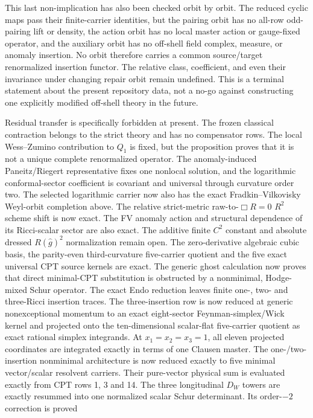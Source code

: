 \documentclass[11pt]{article}
\theoremstyle{definition}
\theoremstyle{remark}
\begin{document}
This last non-implication has also been checked orbit by orbit.  The reduced
cyclic maps pass their finite-carrier identities, but the pairing orbit has
no all-row odd-pairing lift or density, the action orbit has no local master
action or gauge-fixed operator, and the auxiliary orbit has no off-shell
field complex, measure, or anomaly insertion.  No orbit therefore carries a
common source/target renormalized insertion functor.  The relative class,
coefficient, and even their invariance under changing repair orbit remain
undefined.  This is a terminal statement about the present repository data,
not a no-go against constructing one explicitly modified off-shell theory in
the future.

Residual transfer is specifically forbidden at present.  The frozen classical
contraction belongs to the strict theory and has no compensator rows.  The
local Wess--Zumino contribution to $Q_1$ is fixed, but the proposition proves
that it is not a unique complete renormalized operator.  The
anomaly-induced Paneitz/Riegert representative fixes one nonlocal solution,
and the logarithmic conformal-sector coefficient is covariant and universal
through curvature order two.  The selected logarithmic carrier now also has
the exact Fradkin--Vilkovisky Weyl-orbit completion above.  The relative
strict-metric raw-to-$\Box R=0$
$R^2$ scheme shift is now exact.  The FV anomaly action and structural
dependence of its Ricci-scalar sector are also exact.  The additive finite
$C^2$ constant and absolute dressed $R(\widehat g)^2$ normalization remain
open.  The zero-derivative algebraic cubic basis, the parity-even
third-curvature five-carrier quotient and the five exact universal CPT source
kernels are exact.  The generic ghost calculation now proves that direct
minimal-CPT substitution is obstructed by a nonminimal, Hodge-mixed Schur
operator.  The exact Endo reduction leaves finite one-, two- and three-Ricci
insertion traces.  The three-insertion row is now reduced at generic
nonexceptional momentum to an exact eight-sector Feynman-simplex/Wick kernel
and projected onto the ten-dimensional scalar-flat five-carrier quotient as
exact rational simplex integrands.  At $x_1=x_2=x_3=1$, all eleven projected
coordinates are integrated exactly in terms of one Clausen master.  The
one-/two-insertion nonminimal
architecture is now reduced exactly to five minimal vector/scalar resolvent
carriers.  Their pure-vector physical sum is evaluated exactly from CPT rows
1, 3 and 14.  The three longitudinal $D_W$ towers are exactly resummed into
one normalized scalar Schur determinant.  Its order-$-2$ correction is proved
\end{document}
